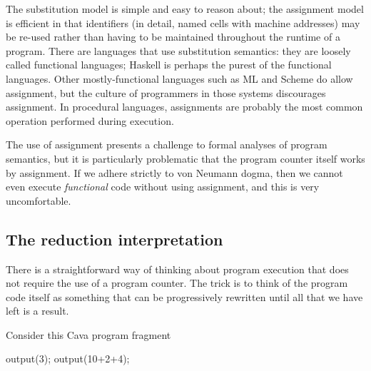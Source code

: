 \documentclass[11pt]{book}
\begin{document}
The substitution model is simple and easy to reason about; the assignment model is efficient in that identifiers (in detail, named cells with machine addresses) may be re-used rather than having to be maintained throughout the runtime of a program. There are languages that use substitution semantics: they are loosely called functional languages; Haskell is perhaps the purest of the functional languages. Other mostly-functional languages such as ML and Scheme do allow assignment, but the culture of programmers in those systems discourages assignment. In procedural languages, assignments are probably the most common operation performed during execution.

The use of assignment presents a challenge to formal analyses of program semantics, but it is particularly problematic that the program counter itself works by assignment. If we adhere strictly to von Neumann dogma, then we cannot even execute {\em functional} code without using assignment, and this is very uncomfortable.

\subsection{The reduction interpretation}
There is a straightforward way of thinking about program execution that does not require the use of a program counter. The trick is to think of the program code itself as something that can be progressively rewritten until all that we have left is a result. 

Consider this Cava program fragment
\begin{codeblock}
output(3);
output(10+2+4);
\end{codeblock}
\end{document}
